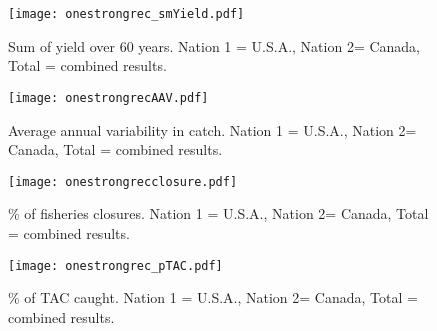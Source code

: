 \documentclass[a4paper]{article}
\begin{document}
\begin{center} %
\begin{figure}[H]               
    \texttt{[image: onestrongrec\_smYield.pdf]}  
	\caption{ Sum of yield over 60 years. Nation 1 = U.S.A., Nation 2= Canada, Total =  combined results. }                
\end{figure}
\end{center}


\begin{center} %
\begin{figure}[H]               
    \texttt{[image: onestrongrecAAV.pdf]}  
	\caption{Average annual variability in catch.  Nation 1 = U.S.A., Nation 2= Canada, Total =  combined results.}                
\end{figure}
\end{center}

\begin{center} %
\begin{figure}[H]               
    \texttt{[image: onestrongrecclosure.pdf]}  
    \caption{ \% of fisheries closures.  Nation 1 = U.S.A., Nation 2= Canada, Total =  combined results.}                
\end{figure}
\end{center}



\begin{center} %
\begin{figure}[H]               
    \texttt{[image: onestrongrec\_pTAC.pdf]}  
    \caption{ \% of TAC caught.  Nation 1 = U.S.A., Nation 2= Canada, Total =  combined results.}                
\end{figure}
\end{center}
\end{document}

